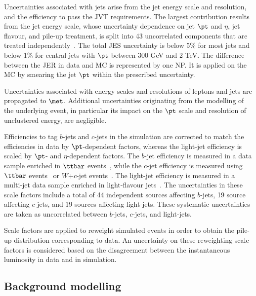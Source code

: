 Uncertainties associated with jets arise from the jet energy scale
and resolution, and the efficiency to pass the JVT requirements. 
The largest contribution results from the jet energy scale, whose uncertainty dependence on jet $\pt$ and $\eta$, jet flavour, and pile-up treatment, 
is split into 43 uncorrelated components that are treated independently~\cite{Aaboud:2017jcu}. The total JES uncertainty is
below 5\% for most jets and below 1\% for central jets with $\pt$ between 300 GeV and 2 TeV. The difference between the JER
in data and MC is represented by one NP. It is applied on the MC by smearing the jet $\pt$ within the prescribed uncertainty.

Uncertainties associated with energy scales and resolutions of leptons and jets 
are propagated to $\met$. Additional uncertainties originating from the modelling 
of the underlying event, in particular its impact on the $\pt$ scale and resolution 
of unclustered energy, are negligible.

Efficiencies to tag $b$-jets and $c$-jets in the simulation are corrected to match the efficiencies in data by $\pt$-dependent factors,
whereas the light-jet efficiency is scaled by $\pt$- and $\eta$-dependent factors.
The $b$-jet efficiency is measured in a data sample enriched in $\ttbar$ events~\cite{Aad:2019epj79}, %
  while the $c$-jet efficiency is measured
using $\ttbar$ events~\cite{ATLAS-CONF-2018-001} or $W$+$c$-jet events~\cite{Aad:2015ydr}. 
The light-jet efficiency is measured in a multi-jet data sample enriched in light-flavour jets~\cite{ATLAS-CONF-2018-006}.
The uncertainties in these scale factors include a total of 44 independent sources affecting $b$-jets, 19 source affecting $c$-jets, and 19 sources affecting light-jets. 
These systematic uncertainties are taken as uncorrelated between $b$-jets, $c$-jets, and light-jets.

Scale factors are applied to reweight simulated events in order to obtain the pile-up distribution corresponding to data. An uncertainty on these reweighting scale factors is considered based on the disagreement between the instantaneous luminosity in data and in simulation.

\subsection{Background modelling}
\label{sec:syst_bkgmodeling}

